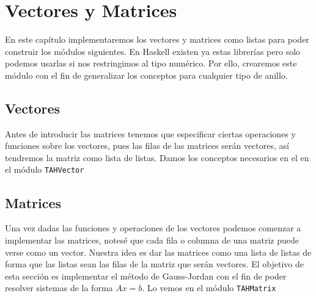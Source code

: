 \chapter{Vectores y Matrices}\label{sec:matrixHas}
En este capítulo implementaremos los vectores y matrices como listas para poder construir los módulos siguientes. En Haskell existen ya estas librerías pero solo podemos usarlas si nos restringimos al tipo numérico. Por ello, crearemos este módulo con el fin de generalizar los conceptos para cualquier tipo de anillo.

\section{Vectores}
Antes de introducir las matrices tenemos que especificar ciertas operaciones y funciones sobre los vectores, pues las filas de las matrices serán vectores, así tendremos la matriz como lista de listas. Damos los conceptos necesarios en el en el módulo \texttt{TAHVector} 

\section{Matrices}
Una vez dadas las funciones y operaciones de los vectores podemos comenzar a implementar las matrices, notesé que cada fila o columna de una matriz puede verse como un vector. Nuestra idea es dar las matrices como una lista de listas de forma que las listas sean las filas de la matriz que serán vectores. El objetivo de esta sección es implementar el método de Gauss-Jordan con el fin de poder resolver sistemas de la forma $Ax=b$. Lo vemos en el módulo \texttt{TAHMatrix} 